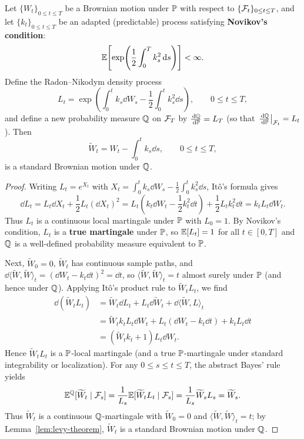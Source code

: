 \begin{theorem}\label{thm:girsanov-app}
    Let $\{W_t\}_{0 \leq t \leq T}$ be a Brownian motion under $\mathbb{P}$ with respect to $\{\mathcal{F}_t\}_{0 \leq t \leq T}$, and let $\{k_t\}_{0 \leq t \leq T}$ be an adapted (predictable) process satisfying \textbf{Novikov's condition}:
    \[
    \mathbb{E}\!\left[\exp\!\left(\frac{1}{2}\int_0^T k_s^2\,\mathrm{d} s\right)\right] < \infty.
    \]
    Define the Radon--Nikodym density process
    \[
    L_t = \exp\!\left(\int_0^t k_s\dd W_s - \frac{1}{2}\int_0^t k_s^2\dd s\right), \qquad 0 \leq t \leq T,
    \]
    and define a new probability measure $\mathbb{Q}$ on $\mathcal{F}_T$ by $\frac{\,\mathrm{d}\mathbb{Q}}{\,\mathrm{d}\mathbb{P}} = L_T$ (so that $\left.\frac{\,\mathrm{d}\mathbb{Q}}{\,\mathrm{d}\mathbb{P}}\right|_{\mathcal{F}_t} = L_t$). Then
    \[
    \widetilde{W}_t = W_t - \int_0^t k_s\dd s, \qquad 0 \leq t \leq T,
    \]
    is a standard Brownian motion under $\mathbb{Q}$.
\end{theorem}
\begin{proof}
    Writing $L_t = e^{X_t}$ with $X_t = \int_0^t k_s\dd W_s - \frac{1}{2}\int_0^t k_s^2\dd s$, It\^o's formula gives
    \[
    \dd L_t = L_t\dd X_t + \frac{1}{2} L_t (\dd X_t)^2 = L_t\left(k_t\dd W_t - \frac{1}{2}k_t^2\dd t\right) + \frac{1}{2} L_t k_t^2\dd t = k_t L_t\dd W_t.
    \]
    Thus $L_t$ is a continuous local martingale under $\mathbb{P}$ with $L_0 = 1$. By Novikov's condition, $L_t$ is a \textbf{true martingale} under $\mathbb{P}$, so $\mathbb{E}[L_t] = 1$ for all $t \in [0, T]$ and $\mathbb{Q}$ is a well-defined probability measure equivalent to $\mathbb{P}$.

    Next, $\widetilde{W}_0 = 0$, $\widetilde{W}_t$ has continuous sample paths, and $\dd\langle \widetilde{W}, \widetilde{W} \rangle_t = (\dd W_t - k_t\dd t)^2 = \dd t$, so $\langle \widetilde{W}, \widetilde{W} \rangle_t = t$ almost surely under $\mathbb{P}$ (and hence under $\mathbb{Q}$). Applying It\^o's product rule to $\widetilde{W}_t L_t$, we find
    \begin{align*}
    \dd(\widetilde{W}_t L_t) &= \widetilde{W}_t\dd L_t + L_t\dd\widetilde{W}_t + \dd\langle \widetilde{W}, L \rangle_t \\
    &= \widetilde{W}_t k_t L_t\dd W_t + L_t(\dd W_t - k_t\dd t) + k_t L_t\dd t \\
    &= (\widetilde{W}_t k_t + 1) L_t\dd W_t.
    \end{align*}
    Hence $\widetilde{W}_t L_t$ is a $\mathbb{P}$-local martingale (and a true $\mathbb{P}$-martingale under standard integrability or localization). For any $0 \leq s \leq t \leq T$, the abstract Bayes' rule yields
    \[
    \mathbb{E}^{\mathbb{Q}}[\widetilde{W}_t \mid \mathcal{F}_s] = \frac{1}{L_s}\mathbb{E}[\widetilde{W}_t L_t \mid \mathcal{F}_s] = \frac{1}{L_s}\widetilde{W}_s L_s = \widetilde{W}_s.
    \]
    Thus $\widetilde{W}_t$ is a continuous $\mathbb{Q}$-martingale with $\widetilde{W}_0 = 0$ and $\langle \widetilde{W}, \widetilde{W} \rangle_t = t$; by Lemma~\ref{lem:levy-theorem}, $\widetilde{W}_t$ is a standard Brownian motion under $\mathbb{Q}$.
\end{proof}

